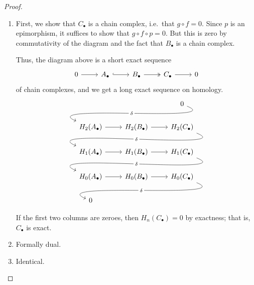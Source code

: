 \documentclass[main.tex]{subfiles}
\begin{document}
\begin{proof}
  \leavevmode
  \begin{enumerate}
    \item First, we show that $C_{\bullet}$ is a chain complex, i.e.\ that $g \circ f = 0$. Since $p$ is an epimorphism, it suffices to show that $g \circ f \circ p = 0$. But this is zero by commutativity of the diagram and the fact that $B_{\bullet}$ is a chain complex.

      Thus, the diagram above is a short exact sequence
      \begin{equation*}
        \begin{tikzcd}
          0
          \arrow[r]
          & A_{\bullet}
          \arrow[r, hook]
          & B_{\bullet}
          \arrow[r, two heads]
          & C_{\bullet}
          \arrow[r]
          & 0
        \end{tikzcd}
      \end{equation*}
      of chain complexes, and we get a long exact sequence on homology.
      \begin{equation*}
        \begin{tikzcd}
          && 0
          \\
          H_{2}(A_{\bullet})
          \arrow[from=urr, out=-22, in=157, looseness=1, overlay, "\delta" description]
          \arrow[r]
          & H_{2}(B_{\bullet})
          \arrow[r]
          & H_{2}(C_{\bullet})
          \\
          H_{1}(A_{\bullet})
          \arrow[from=urr, out=-22, in=157, looseness=1, overlay, "\delta" description]
          \arrow[r]
          & H_{1}(B_{\bullet})
          \arrow[r]
          & H_{1}(C_{\bullet})
          \\
          H_{0}(A_{\bullet})
          \arrow[from=urr, out=-22, in=157, looseness=1, overlay, "\delta" description]
          \arrow[r]
          & H_{0}(B_{\bullet})
          \arrow[r]
          & H_{0}(C_{\bullet})
          \\
          0
          \arrow[from=urr, out=-22, in=157, looseness=1, overlay, "\delta" description]
        \end{tikzcd}
      \end{equation*}

      If the first two columns are zeroes, then $H_{n}(C_{\bullet}) = 0$ by exactness; that is, $C_{\bullet}$ is exact.

    \item Formally dual.
      
    \item Identical.
  \end{enumerate}
\end{proof}
\end{document}
